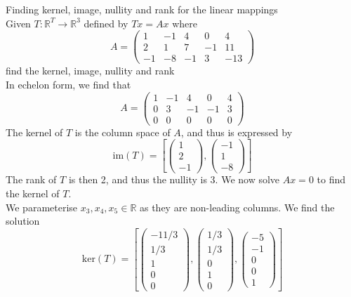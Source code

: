 \documentclass[journal, letterpaper]{IEEEtran}
\begin{document}
    \begin{myboxg}{Finding kernel, image, nullity and rank for the linear mappings} \\ 
        Given $T : \mathbb{R}^T \to \mathbb{R}^3$ defined by $Tx = Ax$ where
        $$ 
        A = \begin{pmatrix}
            1 & -1 & 4 & 0 & 4 \\ 2 & 1 & 7 & -1 & 11 \\ -1 & -8 & -1 & 3 & -13
        \end{pmatrix}
        $$
        find the kernel, image, nullity and rank
        \newline \\
        In echelon form, we find that
        $$ 
        A = \begin{pmatrix}
            1 & -1 & 4 & 0 & 4 \\ 0 & 3 & -1 & -1 & 3 \\ 0 & 0 & 0 & 0 & 0
        \end{pmatrix}
        $$
        The kernel of $T$ is the column space of $A$, and thus is expressed by
        $$ \text{im}(T) = \left[\begin{pmatrix}
            1 \\ 2 \\ -1
        \end{pmatrix}, \begin{pmatrix}
            -1 \\ 1 \\ -8
        \end{pmatrix}\right]$$
        The rank of $T$ is then 2, and thus the nullity is $3$. We now solve $Ax = 0$ to find the kernel of $T$.
        \newline \\  
        We parameterise $x_3, x_4, x_5 \in \mathbb{R}$ as they are non-leading columns. We find the solution
        $$
        \text{ker}(T) = \left[\begin{pmatrix}
            -11/3 \\ 1/3 \\ 1 \\ 0 \\ 0
        \end{pmatrix}, \begin{pmatrix}
            1/3 \\ 1/3 \\ 0 \\ 1\\ 0
        \end{pmatrix}, \begin{pmatrix}
            -5 \\ -1 \\ 0 \\ 0 \\ 1
        \end{pmatrix}\right]
        $$
    \end{myboxg}
\end{document}
